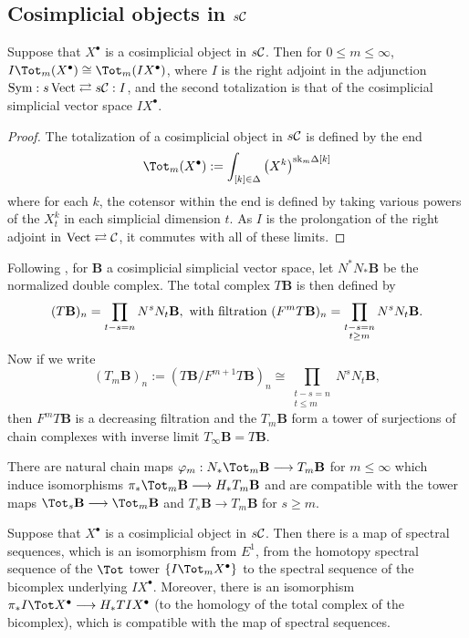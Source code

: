 \documentclass[10pt]{article}
\newcommand{\Comm}{\calC}
\begin{document}
\begin{TotalisationInSAlg}
\subsection{Cosimplicial objects in $s\Comm$}
\begin{prop}
Suppose that $X^\bullet$ is a cosimplicial object in $s\Comm$. Then for $0\leq m\leq\infty$, $I\Tot_m(X^\bullet)\cong\Tot_m(IX^\bullet)$, where $I$ is the right adjoint in the adjunction $\textup{Sym}:s\Vect\rightleftarrows s\Comm:I$, and the second totalization is that of the cosimplicial simplicial vector space $IX^\bullet$.
\end{prop}
\begin{proof}
The totalization of a cosimplicial object in $s\Comm$ is defined by the end
\[\Tot_m(X^\bullet):= \int_{[k]\in\Delta}\left(X^k\right)^{\textup{sk}_m\Delta[k]}\]
where for each $k$, the cotensor within the end is defined by taking various powers of the $X^k_t$ in each simplicial dimension $t$. As $I$ is the prolongation of the right adjoint in $\Vect\rightleftarrows\Comm$, it commutes with all of these limits.
\end{proof}
Following \cite{BousfieldHSSCS.pdf}, for $\textbf{B}$ a cosimplicial simplicial vector space, let $N^*N_*\textbf{B}$ be the normalized double complex. The total complex $T\textbf{B}$ is then defined by
\[(T\textbf{B})_n=\prod_{t-s=n}N^sN_t\textbf{B},\ \textup{with filtration }(F^mT\textbf{B})_n=\prod_{\substack{t-s=n\\t\geq m}}N^sN_t\textbf{B}.\]
Now if we write
\[(T_m\textbf{B})_n:=(T\textbf{B}/F^{m+1} T\textbf{B})_n\cong\prod_{\substack{t-s=n\\t\leq m}}N^sN_t\textbf{B}, \]
then $F^mT\textbf{B}$ is a decreasing filtration and the $T_m\textbf{B}$ form a tower of surjections of chain complexes with inverse limit $T_\infty\textbf{B}=T\textbf{B}$. 
\begin{lem}
There are natural chain maps $\phi_m:N_*\Tot_m\textbf{B}\to T_m\textbf{B}$ for $m\leq\infty$ which induce isomorphisms $\pi_*\Tot_m\textbf{B}\to H_*T_m\textbf{B}$ and are compatible with the tower maps $\Tot_{s}\textbf{B}\to\Tot_m\textbf{B}$ and $T_{s}\textbf{B}\to T_m\textbf{B}$ for $s\geq m$.
\end{lem}
\begin{cor}
Suppose that $X^\bullet$ is a cosimplicial object in $s\Comm$. Then there is a map of spectral sequences, which is an isomorphism from $E^1$, from the homotopy spectral sequence of the $\Tot$ tower $\{I\Tot_mX^\bullet\}$ to the spectral sequence of the bicomplex underlying $IX^\bullet$. Moreover, there is an isomorphism $\pi_*I\Tot X^\bullet\to H_*TIX^\bullet$ (to the homology of the total complex of the bicomplex), which is compatible with the map of spectral sequences.

\end{cor}
\end{TotalisationInSAlg}
\end{document}
